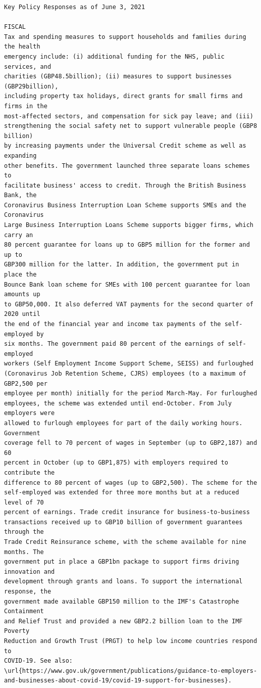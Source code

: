 \documentclass[10pt, letterpaper]{article}
\begin{document}
\begin{spacing}{1.4}
\begin{scriptsize}
\begin{spacing}{.85}
\begin{verbatim}
Key Policy Responses as of June 3, 2021

FISCAL
Tax and spending measures to support households and families during the health
emergency include: (i) additional funding for the NHS, public services, and
charities (GBP48.5billion); (ii) measures to support businesses (GBP29billion),
including property tax holidays, direct grants for small firms and firms in the
most-affected sectors, and compensation for sick pay leave; and (iii)
strengthening the social safety net to support vulnerable people (GBP8 billion)
by increasing payments under the Universal Credit scheme as well as expanding
other benefits. The government launched three separate loans schemes to
facilitate business' access to credit. Through the British Business Bank, the
Coronavirus Business Interruption Loan Scheme supports SMEs and the Coronavirus
Large Business Interruption Loans Scheme supports bigger firms, which carry an
80 percent guarantee for loans up to GBP5 million for the former and up to
GBP300 million for the latter. In addition, the government put in place the
Bounce Bank loan scheme for SMEs with 100 percent guarantee for loan amounts up
to GBP50,000. It also deferred VAT payments for the second quarter of 2020 until
the end of the financial year and income tax payments of the self-employed by
six months. The government paid 80 percent of the earnings of self-employed
workers (Self Employment Income Support Scheme, SEISS) and furloughed
(Coronavirus Job Retention Scheme, CJRS) employees (to a maximum of GBP2,500 per
employee per month) initially for the period March-May. For furloughed
employees, the scheme was extended until end-October. From July employers were
allowed to furlough employees for part of the daily working hours. Government
coverage fell to 70 percent of wages in September (up to GBP2,187) and 60
percent in October (up to GBP1,875) with employers required to contribute the
difference to 80 percent of wages (up to GBP2,500). The scheme for the
self-employed was extended for three more months but at a reduced level of 70
percent of earnings. Trade credit insurance for business-to-business
transactions received up to GBP10 billion of government guarantees through the
Trade Credit Reinsurance scheme, with the scheme available for nine months. The
government put in place a GBP1bn package to support firms driving innovation and
development through grants and loans. To support the international response, the
government made available GBP150 million to the IMF's Catastrophe Containment
and Relief Trust and provided a new GBP2.2 billion loan to the IMF Poverty
Reduction and Growth Trust (PRGT) to help low income countries respond to
COVID-19. See also:
\url{https://www.gov.uk/government/publications/guidance-to-employers-and-businesses-about-covid-19/covid-19-support-for-businesses}.



\end{verbatim}
\end{spacing}
\end{scriptsize}
\end{spacing}
\end{document}
